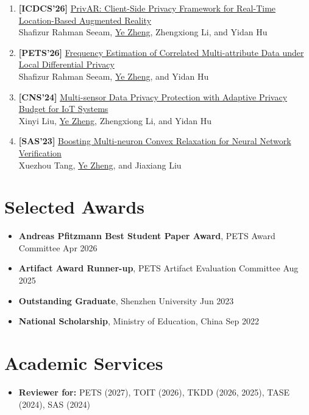 \documentclass[a4paper,11pt]{article}
\begin{document}
\begin{enumerate}[leftmargin=*,labelsep=2mm,start=1]
  \item \textbf{[ICDCS'26]} \href{https://arxiv.org/pdf/2508.02551}
  {PrivAR: Client-Side Privacy Framework for Real-Time Location-Based Augmented Reality} \\
  Shafizur Rahman Seeam, \uline{Ye Zheng}, Zhengxiong Li, and Yidan Hu
  \item \textbf{[PETS'26]} \href{https://arxiv.org/pdf/2507.17516}
  {Frequency Estimation of Correlated Multi-attribute Data under Local Differential Privacy} \\
  Shafizur Rahman Seeam, \uline{Ye Zheng}, and Yidan Hu
  \item \textbf{[CNS'24]} \href{https://ieeexplore.ieee.org/abstract/document/10735696}
  {Multi-sensor Data Privacy Protection with Adaptive Privacy Budget for IoT Systems} \\
  Xinyi Liu, \uline{Ye Zheng}, Zhengxiong Li, and Yidan Hu
  \item \textbf{[SAS'23]} \href{https://link.springer.com/chapter/10.1007/978-3-031-44245-2_23}
  {Boosting Multi-neuron Convex Relaxation for Neural Network Verification} \\
  Xuezhou Tang, \uline{Ye Zheng}, and Jiaxiang Liu
\end{enumerate}


\section{\textbf{Selected Awards}}

\begin{itemize}[leftmargin=0pt,label={}]
  \item \textbf{Andreas Pfitzmann Best Student Paper Award}, PETS Award Committee \hfill Apr 2026
  \item \textbf{Artifact Award Runner-up}, PETS Artifact Evaluation Committee \hfill Aug 2025
  \item \textbf{Outstanding Graduate}, Shenzhen University \hfill Jun 2023
  \item \textbf{National Scholarship}, Ministry of Education, China \hfill Sep 2022
\end{itemize}


\section{\textbf{Academic Services}}

\begin{itemize}[leftmargin=0pt,label={}]
  \item \textbf{Reviewer for:} PETS (2027), TOIT (2026), TKDD (2026, 2025), TASE (2024), SAS (2024)
\end{itemize}
\end{document}
